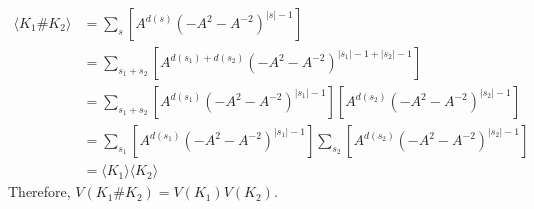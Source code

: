 \documentclass{article}
\theoremstyle{definition}
\numberwithin{theorem}{section}
\numberwithin{equation}{section}
\begin{document}
\begin{align*}
    \langle K_1 \# K_2\rangle &= \sum_{s}\left[A^{d(s)}(-A^2 - A^{-2})^{|s| - 1} \right]\\
    &= \sum_{s_1 + s_2}\left[A^{d(s_1) + d(s_2)}(-A^2 - A^{-2})^{|s_1|- 1 + |s_2| - 1} \right]\\
    &= \sum_{s_1 + s_2}\left[A^{d(s_1)}(-A^2 - A^{-2})^{|s_1|- 1} \right] \left[A^{d(s_2)}(-A^2 - A^{-2})^{|s_2|- 1} \right]\\
    &= \sum_{s_1}\left[A^{d(s_1)}(-A^2 - A^{-2})^{|s_1|- 1} \right] \sum_{s_2}\left[A^{d(s_2)}(-A^2 - A^{-2})^{|s_2|- 1} \right]\\
    &= \langle K_1 \rangle \langle K_2 \rangle
\end{align*}
Therefore,  $V(K_1 \# K_2) = V(K_1) V(K_2)$.
\end{document}
